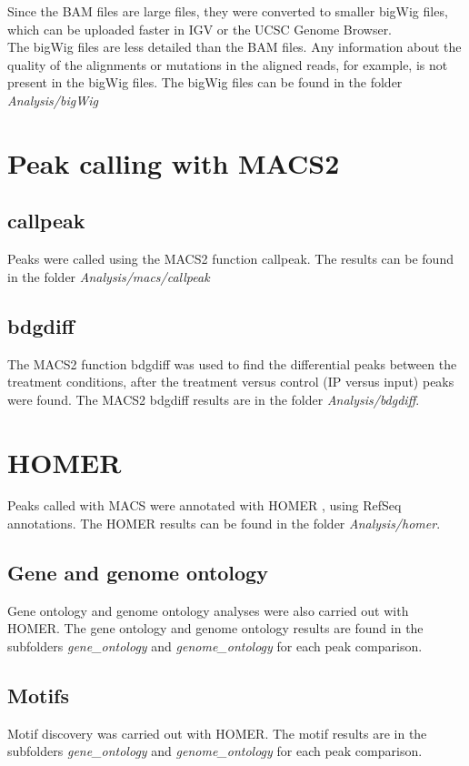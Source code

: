 \documentclass[12pt]{article}
\begin{document}
Since the BAM files are large files, they were converted to smaller bigWig files, which can be uploaded faster in IGV or the UCSC Genome Browser. 
\\The bigWig files are less detailed than the BAM files. Any information about the quality of the alignments or mutations in the aligned reads, for example, is not present in the bigWig files. The bigWig files can be found in the folder \emph{Analysis/bigWig}

\section{Peak calling with MACS2}

\subsection{callpeak}

Peaks were called using the MACS2 \cite{macs} function callpeak. The results can be found in the folder \emph{Analysis/macs/callpeak}

\subsection{bdgdiff}

The MACS2 function bdgdiff was used to find the differential peaks between the treatment conditions, after the treatment versus control (IP versus input) peaks were found. The MACS2 bdgdiff results are in the folder \emph{Analysis/bdgdiff}.

\section{HOMER}

Peaks called with MACS were annotated with HOMER \cite{homer}, using RefSeq annotations. The HOMER results can be found in the folder \emph{Analysis/homer}.

\subsection{Gene and genome ontology}
Gene ontology and genome ontology analyses were also carried out with HOMER. The gene ontology and genome ontology results are found in the subfolders \emph{gene\_ontology} and \emph{genome\_ontology} for each peak comparison.

\subsection{Motifs}
Motif discovery was carried out with HOMER. The motif results are in the subfolders \emph{gene\_ontology} and \emph{genome\_ontology} for each peak comparison.
\end{document}

